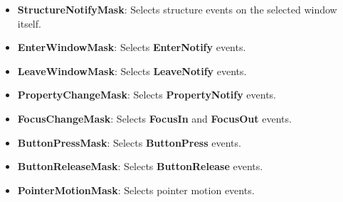 \documentclass{report}
\begin{document}
\begin{itemize}
            \begin{itemize}
                \item \textbf{StructureNotifyMask}: Selects structure events on the selected window itself.
                \item \textbf{EnterWindowMask}: Selects \textbf{EnterNotify} events.
                \item \textbf{LeaveWindowMask}: Selects \textbf{LeaveNotify} events.
                \item \textbf{PropertyChangeMask}: Selects \textbf{PropertyNotify} events.
                \item \textbf{FocusChangeMask}: Selects \textbf{FocusIn} and \textbf{FocusOut} events.
                \item \textbf{ButtonPressMask}: Selects \textbf{ButtonPress} events.
                \item \textbf{ButtonReleaseMask}: Selects \textbf{ButtonRelease} events.
                \item \textbf{PointerMotionMask}: Selects pointer motion events.
            \end{itemize}

    \end{itemize}

    \pagebreak 
\end{document}
